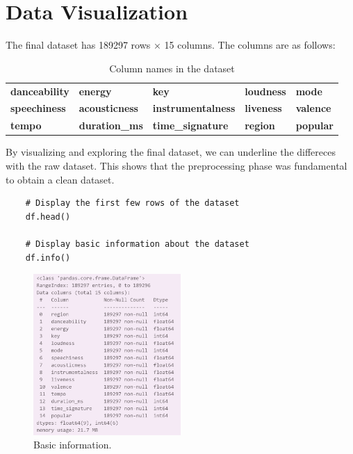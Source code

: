 \chapter{Data Visualization}

The final dataset has 189297 rows × 15 columns. The columns are as follows: 
\begin{table}[h!]
    \centering
    \begin{tabular}{lllll} %
    \toprule
    \textbf{danceability} & \textbf{energy} & \textbf{key} & \textbf{loudness} & \textbf{mode} \\
    \textbf{speechiness} & \textbf{acousticness} & \textbf{instrumentalness} & \textbf{liveness} & \textbf{valence} \\
    \textbf{tempo} & \textbf{duration\_ms} & \textbf{time\_signature} & \textbf{region} & \textbf{popular} \\
    \bottomrule
    \end{tabular}
    \caption{Column names in the dataset}
\end{table}

By visualizing and exploring the final dataset, we can underline the differeces with the raw dataset. This shows that the preprocessing phase was fundamental to obtain a clean dataset.

\begin{verbatim}
    # Display the first few rows of the dataset
    df.head()
    
    # Display basic information about the dataset
    df.info()
    \end{verbatim}
    
    \begin{figure}[h]
        \centering
        \includegraphics[width=0.5\textwidth]{media/info_cleaned.png} 
        \caption{Basic information.}
        \label{df.info()}
    \end{figure}


